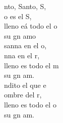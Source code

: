 \begin{cancion}[Santo][Mocedades]%
	nto, Santo, S,\\
	o es el S,\\
	lleno eá todo el o\\
	 su gn amo  \\
	\jump
	sanna en el o,\\
	nna en el r,\\
	lleno es todo el m\\
	 su gn am. \\
	\jump
	ndito el que e\\
	ombre del r,\\
	lleno es todo el o\\
	 su gn am. \\
\end{cancion}%
